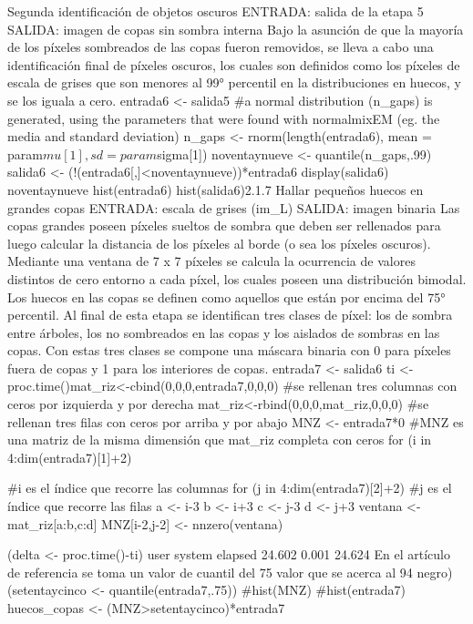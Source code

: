 Segunda identificación de objetos oscuros
ENTRADA: salida de la etapa 5
SALIDA: imagen de copas sin sombra interna
Bajo la asunción de que la mayoría de los píxeles sombreados de las copas fueron
removidos, se lleva a cabo una identificación final de píxeles oscuros, los cuales son
definidos como los píxeles de escala de grises que son menores al 99° percentil en la
distribuciones en huecos, y se los iguala a cero.
entrada6 <- salida5
#a normal distribution (n_gaps) is generated, using the parameters that were found with
normalmixEM (eg. the media and standard deviation)
n_gaps <- rnorm(length(entrada6), mean = param$mu[1], sd = param$sigma[1])
noventaynueve <- quantile(n_gaps,.99)
salida6 <- (!(entrada6[,]<noventaynueve))*entrada6
display(salida6)
noventaynueve
hist(entrada6)
hist(salida6)2.1.7 Hallar pequeños huecos en grandes copas
ENTRADA: escala de grises (im_L)
SALIDA: imagen binaria
Las copas grandes poseen píxeles sueltos de sombra que deben ser rellenados para luego
calcular la distancia de los píxeles al borde (o sea los píxeles oscuros). Mediante una
ventana de 7 x 7 píxeles se calcula la ocurrencia de valores distintos de cero entorno a
cada píxel, los cuales poseen una distribución bimodal. Los huecos en las copas se
definen como aquellos que están por encima del 75° percentil. Al final de esta etapa se
identifican tres clases de píxel: los de sombra entre árboles, los no sombreados en las
copas y los aislados de sombras en las copas. Con estas tres clases se compone una
máscara binaria con 0 para píxeles fuera de copas y 1 para los interiores de copas.
entrada7 <- salida6
ti <- proc.time()mat_riz<-cbind(0,0,0,entrada7,0,0,0) #se rellenan tres columnas con ceros por izquierda
y por derecha
mat_riz<-rbind(0,0,0,mat_riz,0,0,0) #se rellenan tres filas con ceros por arriba y por
abajo
MNZ <- entrada7*0 #MNZ es una matriz de la misma dimensión que mat_riz completa
con ceros
for (i in 4:dim(entrada7)[1]+2) { #i es el índice que recorre las columnas
  for (j in 4:dim(entrada7)[2]+2) { #j es el índice que recorre las filas
      a <- i-3
      b <- i+3
      c <- j-3
      d <- j+3
      ventana <- mat_riz[a:b,c:d]
      MNZ[i-2,j-2] <- nnzero(ventana)
  }
 
}
(delta <- proc.time()-ti)
  user  system elapsed 
 24.602   0.001  24.624
En el artículo de referencia se toma un valor de cuantil del 75%
valor que se acerca al 94%
negro)
(setentaycinco <- quantile(entrada7,.75))
#hist(MNZ)
#hist(entrada7)
huecos_copas <- (MNZ>setentaycinco)*entrada7
